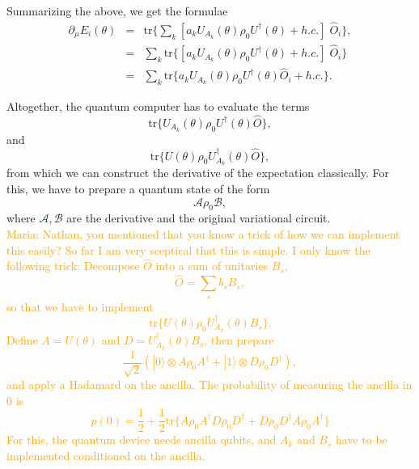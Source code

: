 \documentclass[amsmath,amssymb,aps,pra,10pt,twocolumn,groupedaddress,nofootinbib]{revtex4-1}
\newcommand{\ket}[1]{| #1 \rangle} %
\newcommand{\tr}{\mathrm{tr}}
\newcommand{\maria}[1]{\textcolor{orange}{Maria: #1}}
\begin{document}
Summarizing the above, we get the formulae
\begin{eqnarray*}
	\partial_{\mu} E_i(\theta) &=& \tr \{ \sum_k \left[ a_k  U_{A_k}(\theta) \rho_0 U^{\dagger}(\theta) + h.c. \right] \; \hat{O}_i\}, \\ 
	&=& \sum_k \tr \{  \left[ a_k  U_{A_k}(\theta) \rho_0 U^{\dagger}(\theta) + h.c. \right] \; \hat{O}_i\}\\
	&=& \sum_k \tr \{   a_k  U_{A_k}(\theta) \rho_0 U^{\dagger}(\theta) \hat{O}_i + h.c. \}.
\end{eqnarray*}

Altogether, the quantum computer has to evaluate the terms 
\[ \tr \{  U_{A_k}(\theta) \rho_0 U^{\dagger}(\theta)  \hat{O} \},\]
and
\[ \tr \{  U(\theta) \rho_0 U_{A_k}^{\dagger}(\theta)  \hat{O} \},\]
from which we can construct the derivative of the expectation classically. For this, we have to prepare a quantum state of the form
\[ \mathcal{A} \rho_0 \mathcal{B}, \]
where $ \mathcal{A}, \mathcal{B}$ are the derivative and the original variational circuit. \\

\maria{Nathan, you mentioned that you know a trick of how we can implement this easily? So far I am very sceptical that this is simple. I only know the following trick:
Decompose $\hat{O}$ into a sum of unitaries $B_s$,
\[\hat{O} = \sum_s b_s B_s,\]
so that we have to implement
\[ \tr \{  U(\theta) \rho_0 U_{A_k}^{\dagger}(\theta)  B_s \}.\]
Define $A=U(\theta)$ and $D=U_{A_k}^{\dagger}(\theta)  B_s$, then prepare
\[ \frac{1}{\sqrt{2}} (\ket{0} \otimes A\rho_0 A^{\dagger} + \ket{1} \otimes D\rho_0 D^{\dagger}),\]
and apply a Hadamard on the ancilla. The probability of measuring the ancilla in $0$ is
\[p(0) = \frac{1}{2} + \frac{1}{2} \tr \{ A\rho_0 A^{\dagger} D\rho_0 D^{\dagger} +D\rho_0 D^{\dagger} A\rho_0 A^{\dagger}  \} \]
For this, the quantum device needs ancilla qubits, and $A_k$ and $B_s$ have to be implemented conditioned on the ancilla. }

%
%
\end{document}
